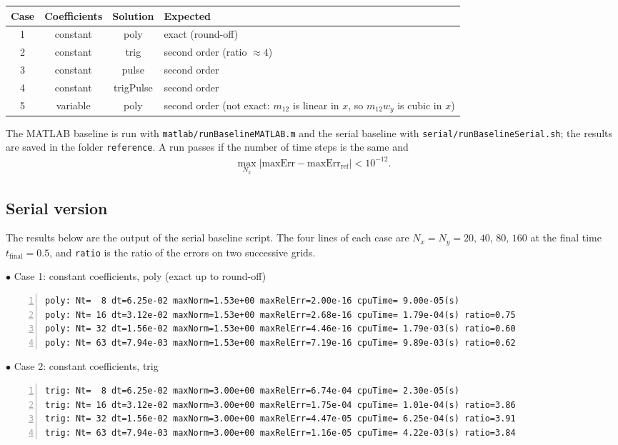 \documentclass[11pt]{article}
\begin{document}
\begin{table}[H]\footnotesize
\begin{center}
\begin{tabular}{|c|c|c|l|} \hline
Case & Coefficients & Solution & Expected \\ \hline
1 & constant & poly      & exact (round-off) \\
2 & constant & trig      & second order (ratio $\approx 4$) \\
3 & constant & pulse     & second order \\
4 & constant & trigPulse & second order \\
5 & variable & poly      & second order (not exact: $m_{12}$ is linear in $x$, so $m_{12}w_y$ is cubic in $x$) \\ \hline
\end{tabular}
\end{center}
\end{table}
The MATLAB baseline is run with \texttt{matlab/runBaselineMATLAB.m} and the serial baseline with \texttt{serial/runBaselineSerial.sh}; the results are saved in the folder \texttt{reference}. A run passes if the number of time steps is the same and
\begin{align*}
\max_{N_x}\left|\mbox{maxErr}-\mbox{maxErr}_{\text{ref}}\right|<10^{-12}.
\end{align*}

\subsection{Serial version}
The results below are the output of the serial baseline script. The four lines of each case are $N_x=N_y=20,\,40,\,80,\,160$ at the final time $t_{\text{final}}=0.5$, and \texttt{ratio} is the ratio of the errors on two successive grids.

$\bullet$ Case 1: constant coefficients, poly (exact up to round-off)
\begin{Verbatim}[fontsize=\footnotesize,formatcom=\color{blue},frame=single,framerule=1pt,numbers=left]
poly: Nt=  8 dt=6.25e-02 maxNorm=1.53e+00 maxRelErr=2.00e-16 cpuTime= 9.00e-05(s)
poly: Nt= 16 dt=3.12e-02 maxNorm=1.53e+00 maxRelErr=2.68e-16 cpuTime= 1.79e-04(s) ratio=0.75
poly: Nt= 32 dt=1.56e-02 maxNorm=1.53e+00 maxRelErr=4.46e-16 cpuTime= 1.79e-03(s) ratio=0.60
poly: Nt= 63 dt=7.94e-03 maxNorm=1.53e+00 maxRelErr=7.19e-16 cpuTime= 9.89e-03(s) ratio=0.62
\end{Verbatim}

$\bullet$ Case 2: constant coefficients, trig
\begin{Verbatim}[fontsize=\footnotesize,formatcom=\color{blue},frame=single,framerule=1pt,numbers=left]
trig: Nt=  8 dt=6.25e-02 maxNorm=3.00e+00 maxRelErr=6.74e-04 cpuTime= 2.30e-05(s)
trig: Nt= 16 dt=3.12e-02 maxNorm=3.00e+00 maxRelErr=1.75e-04 cpuTime= 1.01e-04(s) ratio=3.86
trig: Nt= 32 dt=1.56e-02 maxNorm=3.00e+00 maxRelErr=4.47e-05 cpuTime= 6.25e-04(s) ratio=3.91
trig: Nt= 63 dt=7.94e-03 maxNorm=3.00e+00 maxRelErr=1.16e-05 cpuTime= 4.22e-03(s) ratio=3.84
\end{Verbatim}
\end{document}
